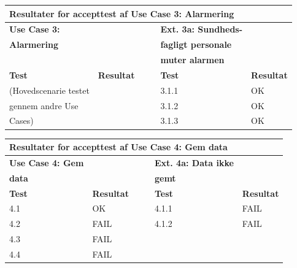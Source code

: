 \begin{table}[h!]
	\centering
	\begin{tabular}{llllll}
		\multicolumn{6}{l}{\cellcolor[HTML]{187ABD}\textbf{Resultater for accepttest af Use Case 3: Alarmering}} \\ \hline
		\textbf{Use Case 3:} & \multicolumn{1}{l|}{} &  & \multicolumn{1}{l|}{} & \textbf{Ext. 3a: Sundheds-} &  \\
		\textbf{Alarmering} & \multicolumn{1}{l|}{} &  & \multicolumn{1}{l|}{} & \textbf{fagligt personale} &  \\
		& \multicolumn{1}{l|}{} &  & \multicolumn{1}{l|}{} & \textbf{muter alarmen} &  \\ \cline{1-2} \cline{5-6} 
		\textbf{Test} & \multicolumn{1}{l|}{\textbf{Resultat}} &  & \multicolumn{1}{l|}{} & \textbf{Test} & \textbf{Resultat} \\ \cline{1-2} \cline{5-6} 
		(Hovedscenarie testet & \multicolumn{1}{l|}{} &  & \multicolumn{1}{l|}{} & 3.1.1 & OK \\ \cline{5-6} 
		gennem andre Use & \multicolumn{1}{l|}{} &  & \multicolumn{1}{l|}{} & 3.1.2 & OK \\ \cline{5-6} 
		Cases) & \multicolumn{1}{l|}{} &  & \multicolumn{1}{l|}{} & 3.1.3 & OK
	\end{tabular}
\end{table}

\begin{table}[h!]
	\centering
	\begin{tabular}{llllll}
		\multicolumn{6}{l}{\cellcolor[HTML]{187ABD}\textbf{Resultater for accepttest af Use Case 4: Gem data}} \\ \hline
		\textbf{Use Case 4: Gem} & \multicolumn{1}{l|}{} &  & \multicolumn{1}{l|}{} & \textbf{Ext. 4a: Data ikke} &  \\
		\textbf{data} & \multicolumn{1}{l|}{} &  & \multicolumn{1}{l|}{} & \textbf{gemt} &  \\ \cline{1-2} \cline{5-6} 
		\textbf{Test} & \multicolumn{1}{l|}{\textbf{Resultat}} &  & \multicolumn{1}{l|}{} & \textbf{Test} & \textbf{Resultat} \\ \cline{1-2} \cline{5-6} 
		4.1 & \multicolumn{1}{l|}{OK} &  & \multicolumn{1}{l|}{} & 4.1.1 & FAIL \\ \cline{1-2} \cline{5-6} 
		4.2 & \multicolumn{1}{l|}{FAIL} &  & \multicolumn{1}{l|}{} & 4.1.2 & FAIL \\ \cline{1-2} \cline{5-6} 
		4.3 & \multicolumn{1}{l|}{FAIL} &  & \multicolumn{1}{l|}{} &  &  \\ \cline{1-2} \cline{5-6} 
		4.4 & \multicolumn{1}{l|}{FAIL} &  & \multicolumn{1}{l|}{} &  & 
	\end{tabular}
\end{table}


